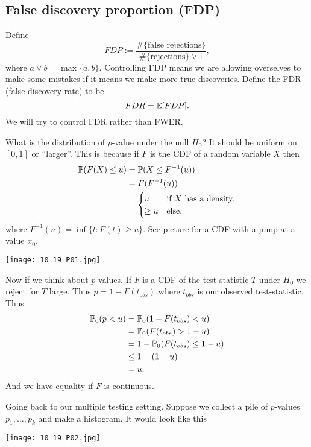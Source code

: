 \subsection{False discovery proportion (FDP)}
Define
\[FDP:= \frac{\#\{\text{false rejections}\}}{\#\{\text{rejections}\} \lor 1}, \]
where $a\lor b = \max\{a,b\}$. Controlling FDP means we are allowing overselves to make some mistakes if it means we make more true discoveries. Define the FDR (false discovery rate) to be
\[FDR = {\mathbb{E}}[FDP].\]
We will try to control FDR rather than FWER. 
\begin{aside}
    What is the distribution of $p$-value under the null $H_0$? It should be uniform on $[0,1]$ or ``larger''. This is because if $F$ is the CDF of a random variable $X$ then 
    \begin{align*}
        {\mathbb{P}}(F(X) \le u) &= {\mathbb{P}}(X \le F^{-1}(u))\\
        &=F(F^{-1}(u))\\
        &=\begin{cases}
            u & \text{if } X \text{ has a density},\\
            \ge u & \text{else}.
        \end{cases}
    \end{align*}
    where $F^{-1}(u) = \inf\{t: F(t) \ge u \}$. See picture for a CDF with a jump at a value $x_0$.

    \begin{center}
        \texttt{[image: 10\_19\_P01.jpg]}
    \end{center}
    
    Now if we think about $p$-values. If $F$ is a CDF of the test-statistic $T$ under $H_0$ we reject for $T$ large. Thus $p = 1-F(t_{obs})$ where $t_{obs}$ is our observed test-statistic. Thus 
    \begin{align*}
        {\mathbb{P}}_0(p<u)&= {\mathbb{P}}_0(1-F(t_{obs})<u)\\
        &={\mathbb{P}}_0(F(t_{obs})>1-u)\\
        &=1-{\mathbb{P}}_0(F(t_{obs})\le 1-u)\\
        &\le 1-(1-u)\\
        &=u.
    \end{align*}
    And we have equality if $F$ is continuous.
\end{aside}
Going back to our multiple testing setting. Suppose we collect a pile of $p$-values $p_1,\ldots, p_k$ and make a histogram. It would look like this

\begin{center}
    \texttt{[image: 10\_19\_P02.jpg]}
\end{center}

